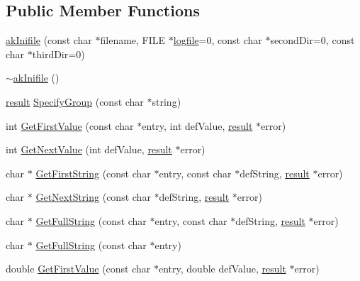 \subsection*{Public Member Functions}
\begin{DoxyCompactItemize}
\item 
\hyperlink{classakInifile_a1e9d24ec7cccf0bc5897ec53fe71e9d9}{ak\-Inifile} (const char $\ast$filename, F\-I\-L\-E $\ast$\hyperlink{classakInifile_a9c55ea25efdedced0815835562454354}{logfile}=0, const char $\ast$second\-Dir=0, const char $\ast$third\-Dir=0)
\item 
\hyperlink{classakInifile_abf7f09a88016cafb4b7d3a7baa7f25f9}{$\sim$ak\-Inifile} ()
\item 
\hyperlink{classInifile_a42a1cfa6fc8618c8b28d449626f0ecde}{result} \hyperlink{classakInifile_a470c40676b92718698ecbb3055e2c2b1}{Specify\-Group} (const char $\ast$string)
\item 
int \hyperlink{classakInifile_ae17125c1f87eab81b1843f33cf68a949}{Get\-First\-Value} (const char $\ast$entry, int def\-Value, \hyperlink{classInifile_a42a1cfa6fc8618c8b28d449626f0ecde}{result} $\ast$error)
\item 
int \hyperlink{classakInifile_a8d14c6541da3f0ab9de6c788bbbabc42}{Get\-Next\-Value} (int def\-Value, \hyperlink{classInifile_a42a1cfa6fc8618c8b28d449626f0ecde}{result} $\ast$error)
\item 
char $\ast$ \hyperlink{classakInifile_a34c9714861ffe91f1a1e2a13c0b2a0c9}{Get\-First\-String} (const char $\ast$entry, const char $\ast$def\-String, \hyperlink{classInifile_a42a1cfa6fc8618c8b28d449626f0ecde}{result} $\ast$error)
\item 
char $\ast$ \hyperlink{classakInifile_a9dc548353a814f8e756c76eb6c960b8b}{Get\-Next\-String} (const char $\ast$def\-String, \hyperlink{classInifile_a42a1cfa6fc8618c8b28d449626f0ecde}{result} $\ast$error)
\item 
char $\ast$ \hyperlink{classakInifile_af67d760bc22ad6a48e1b1c9157d54dab}{Get\-Full\-String} (const char $\ast$entry, const char $\ast$def\-String, \hyperlink{classInifile_a42a1cfa6fc8618c8b28d449626f0ecde}{result} $\ast$error)
\item 
char $\ast$ \hyperlink{classakInifile_af2e11814e8311e9cf2d18b5afad7b7c8}{Get\-Full\-String} (const char $\ast$entry)
\item 
double \hyperlink{classakInifile_a84e553a71b399b79190a6d3215efac91}{Get\-First\-Value} (const char $\ast$entry, double def\-Value, \hyperlink{classInifile_a42a1cfa6fc8618c8b28d449626f0ecde}{result} $\ast$error)

\end{DoxyCompactItemize}
